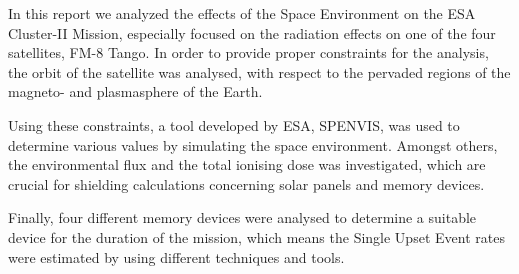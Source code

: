 \clearpage\thispagestyle{empty}\addtocounter{page}{-1} 
\abstract
In this report we analyzed the effects of the Space Environment on the ESA Cluster-II Mission, especially focused on the radiation effects on one of the four satellites, FM-8 Tango.
In order to provide proper constraints for the analysis, the orbit of the satellite was analysed, with respect to the pervaded regions of the magneto- and plasmasphere of the Earth.

Using these constraints, a tool developed by ESA, SPENVIS, was used to determine various values by simulating the space environment.
Amongst others, the environmental flux and the total ionising dose was investigated, which are crucial for shielding calculations concerning solar panels and memory devices.

Finally, four different memory devices were analysed to determine a suitable device for the duration of the mission, which means the Single Upset Event rates were estimated by using different techniques and tools.


